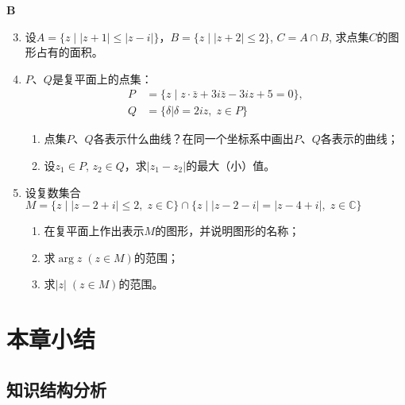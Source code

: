 \begin{center}
    \bfseries B
\end{center}
\begin{enumerate}\setcounter{enumi}{2}
    \item 设$A=\{z\mid |z+1|\le |z-i|\}$，$B=\{z\mid |z+2|\le 2\}$, $C=A\cap B$,
    求点集$C$的图形占有的面积。
    \item $P$、$Q$是复平面上的点集：
\[\begin{split}
    P&=\{z\mid z\cdot \bar z+3i\bar z-3iz+5=0\},\\
    Q&=\{\delta |\delta =2iz,\; z\in P\}
\end{split}\]
\begin{enumerate}[(1)]
\item 点集$P$、$Q$各表示什么曲线？在同一个坐标系中画出$P$、$Q$各表示的曲线；
\item 设$z_1\in P$, $z_2\in Q$，求$|z_1-z_2|$的最大（小）值。
\end{enumerate}

    \item 设复数集合$M=\{z\mid |z-2+i|\le 2,\; z\in\mathbb{C}\}\cap\{z\mid |z-2-i|=|z-4+i|,\; z\in\mathbb{C}\}$
\begin{enumerate}[(1)]
\item 在复平面上作出表示$M$的图形，并说明图形的名称；
\item 求$\arg z\; (z\in M)$的范围；
\item 求$|z|\; (z\in M)$的范围。 
\end{enumerate}
\end{enumerate}


\section{本章小结}
\subsection{知识结构分析}

